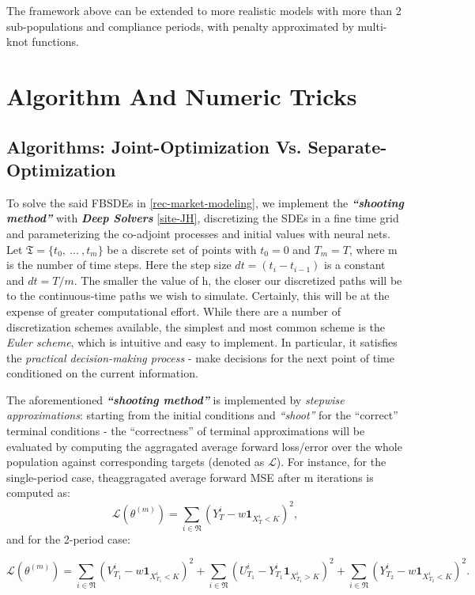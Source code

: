 \documentclass[a4paper,10pt]{article}
\newcommand{\1}{\mathbf{1}}
\begin{document}
The framework above can be extended to more realistic models with more
than 2 sub-populations and compliance periods, with penalty approximated
by multi-knot functions.

\section{Algorithm And Numeric
Tricks}

\subsection{Algorithms: Joint-Optimization Vs.
Separate-Optimization}

To solve the said FBSDEs in \ref{rec-market-modeling}, we
implement the \textbf{\emph{``shooting method''}} with \emph{\textbf{Deep Solvers}}
\ref{site-JH}, discretizing the SDEs in a fine time grid and parameterizing the
co-adjoint processes and initial values with neural nets. Let
\(\mathfrak{T}=\lbrace{t_0,~...~, t_m \rbrace}\) be a discrete set of
points with \(t_0=0\) and \(T_m=T\), where m is the number of time
steps. Here the step size \(dt=(t_i-t_{i-1})\) is a constant and
\(dt=T/m\). The smaller the value of h, the closer our discretized paths
will be to the continuous-time paths we wish to simulate. Certainly,
this will be at the expense of greater computational effort. While there
are a number of discretization schemes available, the simplest and most
common scheme is the \emph{Euler scheme}, which is intuitive and easy to
implement. In particular, it satisfies the \emph{practical
decision-making process} - make decisions for the next point of time
conditioned on the current information.

The aforementioned \textbf{\emph{``shooting method''}} is implemented by
\emph{stepwise approximations}: starting from the initial conditions and
\emph{``shoot''} for the ``correct'' terminal conditions - the
``correctness'' of terminal approximations will be evaluated by
computing the aggragated average forward loss/error over the whole
population against corresponding targets (denoted as \(\mathcal{L}\)).
For instance, for the single-period case, theaggragated average forward
MSE after m iterations is computed as: \[
\mathcal{L}(\theta^{(m)})= \sum_{i\in\mathfrak{N}}(Y_{T}^i-w\mathbf{1}_{X_{T}^i<K})^2,
\] and for the 2-period case:

\[
\mathcal{L}(\theta^{(m)})= \sum_{i\in\mathfrak{N}}(V_{T_1}^i-w\mathbf{1}_{X_{T_1}^i<K})^2 + \sum_{i\in\mathfrak{N}}(U_{T_1}^i-Y_{T_1}^i\mathbf{1}_{X_{T_1}^i>K})^2 + \sum_{i\in\mathfrak{N}}(Y_{T_2}^i-w\mathbf{1}_{X_{T_2}^i<K})^2.
\]
\end{document}
